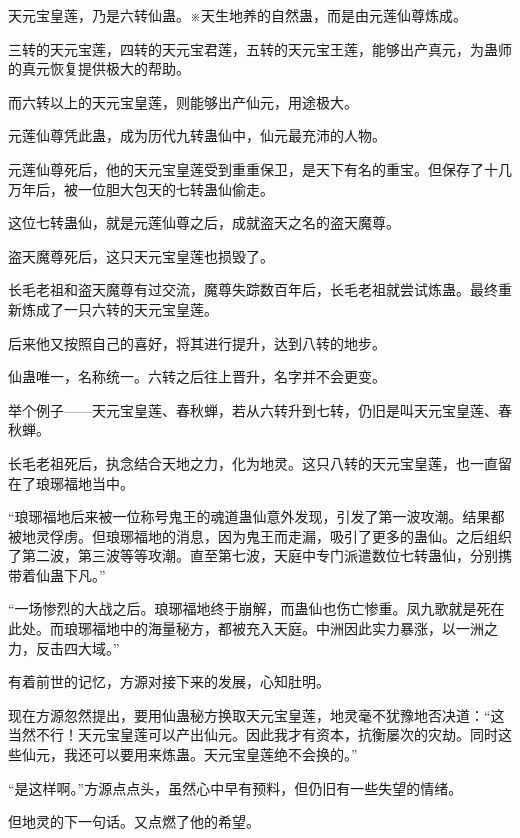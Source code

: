 
\begin{this_body}



天元宝皇莲，乃是六转仙蛊。※天生地养的自然蛊，而是由元莲仙尊炼成。

三转的天元宝莲，四转的天元宝君莲，五转的天元宝王莲，能够出产真元，为蛊师的真元恢复提供极大的帮助。

而六转以上的天元宝皇莲，则能够出产仙元，用途极大。

元莲仙尊凭此蛊，成为历代九转蛊仙中，仙元最充沛的人物。

元莲仙尊死后，他的天元宝皇莲受到重重保卫，是天下有名的重宝。但保存了十几万年后，被一位胆大包天的七转蛊仙偷走。

这位七转蛊仙，就是元莲仙尊之后，成就盗天之名的盗天魔尊。

盗天魔尊死后，这只天元宝皇莲也损毁了。

长毛老祖和盗天魔尊有过交流，魔尊失踪数百年后，长毛老祖就尝试炼蛊。最终重新炼成了一只六转的天元宝皇莲。

后来他又按照自己的喜好，将其进行提升，达到八转的地步。

仙蛊唯一，名称统一。六转之后往上晋升，名字并不会更变。

举个例子——天元宝皇莲、春秋蝉，若从六转升到七转，仍旧是叫天元宝皇莲、春秋蝉。

长毛老祖死后，执念结合天地之力，化为地灵。这只八转的天元宝皇莲，也一直留在了琅琊福地当中。

“琅琊福地后来被一位称号鬼王的魂道蛊仙意外发现，引发了第一波攻潮。结果都被地灵俘虏。但琅琊福地的消息，因为鬼王而走漏，吸引了更多的蛊仙。之后组织了第二波，第三波等等攻潮。直至第七波，天庭中专门派遣数位七转蛊仙，分别携带着仙蛊下凡。”

“一场惨烈的大战之后。琅琊福地终于崩解，而蛊仙也伤亡惨重。凤九歌就是死在此处。而琅琊福地中的海量秘方，都被充入天庭。中洲因此实力暴涨，以一洲之力，反击四大域。”

有着前世的记忆，方源对接下来的发展，心知肚明。

现在方源忽然提出，要用仙蛊秘方换取天元宝皇莲，地灵毫不犹豫地否决道：“这当然不行！天元宝皇莲可以产出仙元。因此我才有资本，抗衡屡次的灾劫。同时这些仙元，我还可以要用来炼蛊。天元宝皇莲绝不会换的。”

“是这样啊。”方源点点头，虽然心中早有预料，但仍旧有一些失望的情绪。

但地灵的下一句话。又点燃了他的希望。


\end{this_body}
